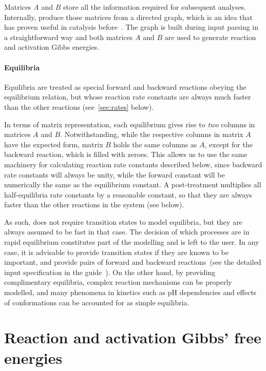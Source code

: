 Matrices $A$ and $B$ store all the information required for subsequent analyses.
Internally,
\overreact produce those matrices from a directed graph,
which is an idea that has proven useful in catalysis before~\cite{Kozuch_2006,Kozuch_2015,Solel_2019}.
The graph is built during input parsing in a straightforward way and both matrices $A$ and $B$ are used to generate reaction and activation Gibbs energies.

\paragraph{Equilibria}

Equilibria are treated as special forward and backward reactions obeying the equilibrium relation,
but whose reaction rate constants are always much faster than the other reactions (see~\cref{sec:rates} below).

In terms of matrix representation,
each equilibrium gives rise to \emph{two} columns in matrices $A$ and $B$.
Notwithstanding,
while the respective columns in matrix $A$ have the expected form,
matrix $B$ holds the same columns as $A$,
except for the backward reaction,
which is filled with zeroes.
This allows us to use the same machinery for calculating reaction rate constants described below,
since backward rate constants will always be unity,
while the forward constant will be numerically the same as the equilibrium constant.
A post-treatment multiplies all half-equilibria rate constants by a reasonable constant,
so that they are always faster than the other reactions in the system (see below).

As such,
\overreact does not require transition states to model equilibria,
but they are always assumed to be fast in that case.
The decision of which processes are in rapid equilibrium constitutes part of the modelling and is left to the user.
In any case,
it is advisable to provide transition states if they are known to be important,
and provide pairs of forward
and backward reactions~(see the detailed input specification in the guide~\cite{overreactguideinput2022}).
On the other hand,
by providing complimentary equilibria,
complex reaction mechanisms can be properly modelled,
and many phenomena in kinetics such as pH dependencies and effects of conformations can be accounted for as simple equilibria.

\section{Reaction and activation Gibbs' free energies}

